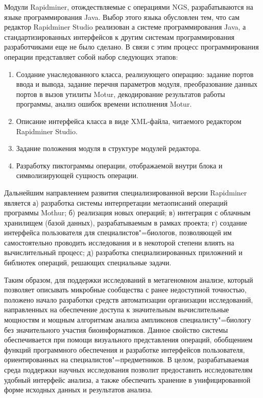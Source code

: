 \documentclass[a4paper,12pt,openany,final]{extreport}
\begin{document}
Модули Rapidminer, отождествляемые с операциями NGS, разрабатываются на языке программирования Java. Выбор этого языка обусловлен тем, что сам редактор Rapidminer Studio реализован а системе программирования Java, а стандартизированных интерфейсов к другим системам программирования разработчиками еще не было сделано. В связи с этим процесс программирования операции представляет собой набор следующих этапов:

\begin{enumerate}
\item Создание унаследованного класса, реализующего операцию: задание портов ввода и вывода, задание перечня параметров модуля, преобразование данных портов в вызов утилиты Motur, декодирование результатов работы программы, анализ ошибок времени исполнения Motur.
\item Описание интерфейса класса в виде XML-файла, читаемого редактором Rapidminer Studio.
\item Задание положения модуля в структуре модулей редактора.
\item Разработку пиктограммы операции, отображаемой внутри блока и символизирующей сущность операции.
\end{enumerate}

Дальнейшим направлением развития специализированной версии Rapidminer является а) разработка системы интерпретации метаописаний операций программы Mothur; б) реализация новых операций; в) интеграция с облачным хранилищем (базой данных), разрабатываемым в рамках проекта; г) создание интерфейса пользователя для специалистов"=биологов, позволяющей им самостоятельно проводить исследования и в некоторой степени влиять на вычислительный процесс; д) разработка специализированных приложений и библиотек операций, решающих специальные задачи.

Таким образом, для поддержки исследований в метагеномном анализе, который позволяет описывать микробные сообщества с ранее недоступной точностью, положено начало разработки средств автоматизации организации исследований, направленных на обеспечение доступа к значительным вычислительные мощностям и мощным алгоритмам анализа ампликонов специалисту"=биологу без значительного участия биоинформатиков. Данное свойство системы обеспечивается при помощи визуального представления операций, обобщением функций программного обеспечения и разработке интерфейсов пользователя, ориентированных на специалистов"=предметников.  В целом, разрабатываемая среда поддержки научных исследования позволит предоставить исследователям удобный интерфейс анализа, а также обеспечить хранение в унифицированной форме исходных данных и результатов анализа.
\end{document}
